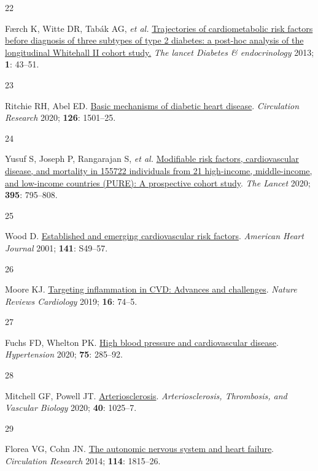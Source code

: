 \documentclass[
  a4paper,
  headsepline=true,
  open=left]{scrbook}
\newlength{\cslhangindent}
\newlength{\csllabelwidth}
\newlength{\cslentryspacingunit} %
\newenvironment{CSLReferences}[2] %
 {%
  \setlength{\parindent}{0pt}
  \ifodd #1
  \let\oldpar\par
  \def\par{\hangindent=\cslhangindent\oldpar}
  \fi
  \setlength{\parskip}{#2\cslentryspacingunit}
 }%
 {}
\newcommand{\CSLLeftMargin}[1]{\parbox[t]{\csllabelwidth}{#1}}
\newcommand{\CSLRightInline}[1]{\parbox[t]{\linewidth - \csllabelwidth}{#1}\break}
\begin{document}
\begin{CSLReferences}{0}{0}
\leavevmode{}%
\CSLLeftMargin{22 }%
\CSLRightInline{Færch K, Witte DR, Tabák AG, \emph{et al.}
\href{https://doi.org/10.1016/S2213-8587(13)70008-1}{Trajectories of
cardiometabolic risk factors before diagnosis of three subtypes of type
2 diabetes: a post-hoc analysis of the longitudinal Whitehall II cohort
study.} \emph{The lancet Diabetes \& endocrinology} 2013; \textbf{1}:
43--51.}

\leavevmode{}%
\CSLLeftMargin{23 }%
\CSLRightInline{Ritchie RH, Abel ED.
\href{https://doi.org/10.1161/CIRCRESAHA.120.315913}{Basic mechanisms of
diabetic heart disease}. \emph{Circulation Research} 2020; \textbf{126}:
1501--25.}

\leavevmode{}%
\CSLLeftMargin{24 }%
\CSLRightInline{Yusuf S, Joseph P, Rangarajan S, \emph{et al.}
\href{https://doi.org/10.1016/S0140-6736(19)32008-2}{Modifiable risk
factors, cardiovascular disease, and mortality in 155{\hphantom{,}}722
individuals from 21 high-income, middle-income, and low-income countries
(PURE): A prospective cohort study}. \emph{The Lancet} 2020;
\textbf{395}: 795--808.}

\leavevmode{}%
\CSLLeftMargin{25 }%
\CSLRightInline{Wood D.
\href{https://doi.org/10.1067/mhj.2001.109951}{Established and emerging
cardiovascular risk factors}. \emph{American Heart Journal} 2001;
\textbf{141}: S49--57.}

\leavevmode{}%
\CSLLeftMargin{26 }%
\CSLRightInline{Moore KJ.
\href{https://doi.org/10.1038/s41569-018-0144-3}{Targeting inflammation
in CVD: Advances and challenges}. \emph{Nature Reviews Cardiology} 2019;
\textbf{16}: 74--5.}

\leavevmode{}%
\CSLLeftMargin{27 }%
\CSLRightInline{Fuchs FD, Whelton PK.
\href{https://doi.org/10.1161/HYPERTENSIONAHA.119.14240}{High blood
pressure and cardiovascular disease}. \emph{Hypertension} 2020;
\textbf{75}: 285--92.}

\leavevmode{}%
\CSLLeftMargin{28 }%
\CSLRightInline{Mitchell GF, Powell JT.
\href{https://doi.org/10.1161/ATVBAHA.120.314208}{Arteriosclerosis}.
\emph{Arteriosclerosis, Thrombosis, and Vascular Biology} 2020;
\textbf{40}: 1025--7.}

\leavevmode{}%
\CSLLeftMargin{29 }%
\CSLRightInline{Florea VG, Cohn JN.
\href{https://doi.org/10.1161/CIRCRESAHA.114.302589}{The autonomic
nervous system and heart failure}. \emph{Circulation Research} 2014;
\textbf{114}: 1815--26.}


\end{CSLReferences}
\end{document}
